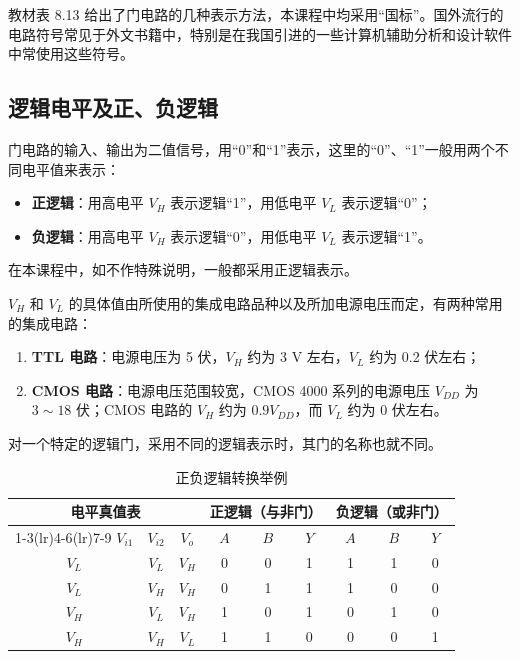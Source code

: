 \begin{note}
	教材表 8.13 给出了门电路的几种表示方法，本课程中均采用“国标”。国外流行的电路符号常见于外文书籍中，特别是在我国引进的一些计算机辅助分析和设计软件中常使用这些符号。
\end{note}

\subsection{逻辑电平及正、负逻辑}
\label{sec:逻辑电平}

门电路的输入、输出为二值信号，用“0”和“1”表示，这里的“0”、“1”一般用两个不同电平值来表示：

\begin{definition}[正逻辑与负逻辑]
\label{def:正负逻辑}
\begin{itemize}
	\item \textbf{正逻辑}：用高电平 $V_H$ 表示逻辑“1”，用低电平 $V_L$ 表示逻辑“0”；
	\item \textbf{负逻辑}：用高电平 $V_H$ 表示逻辑“0”，用低电平 $V_L$ 表示逻辑“1”。
\end{itemize}
在本课程中，如不作特殊说明，一般都采用正逻辑表示。
\end{definition}

$V_H$ 和 $V_L$ 的具体值由所使用的集成电路品种以及所加电源电压而定，有两种常用的集成电路：
\begin{enumerate}
	\item \textbf{TTL 电路}：电源电压为 5 伏，$V_H$ 约为 3 V 左右，$V_L$ 约为 0.2 伏左右；
	\item \textbf{CMOS 电路}：电源电压范围较宽，CMOS 4000 系列的电源电压 $V_{DD}$ 为 $3\sim18$ 伏；CMOS 电路的 $V_H$ 约为 $0.9V_{DD}$，而 $V_L$ 约为 0 伏左右。
\end{enumerate}

对一个特定的逻辑门，采用不同的逻辑表示时，其门的名称也就不同。

\begin{table}[H]
\centering
\caption{正负逻辑转换举例}
\label{tab:逻辑电平:正负逻辑转换}
\begin{tabular}{ccc|ccc|ccc}
	\toprule
	\multicolumn{3}{c|}{电平真值表} & \multicolumn{3}{c|}{正逻辑（与非门）} & \multicolumn{3}{c}{负逻辑（或非门）} \\
	\cmidrule(lr){1-3}\cmidrule(lr){4-6}\cmidrule(lr){7-9}
	$V_{i1}$ & $V_{i2}$ & $V_o$ & $A$ & $B$ & $Y$ & $A$ & $B$ & $Y$ \\
	\midrule
	$V_L$ & $V_L$ & $V_H$ & 0 & 0 & 1 & 1 & 1 & 0 \\
	$V_L$ & $V_H$ & $V_H$ & 0 & 1 & 1 & 1 & 0 & 0 \\
	$V_H$ & $V_L$ & $V_H$ & 1 & 0 & 1 & 0 & 1 & 0 \\
	$V_H$ & $V_H$ & $V_L$ & 1 & 1 & 0 & 0 & 0 & 1 \\
	\bottomrule
\end{tabular}
\end{table}

